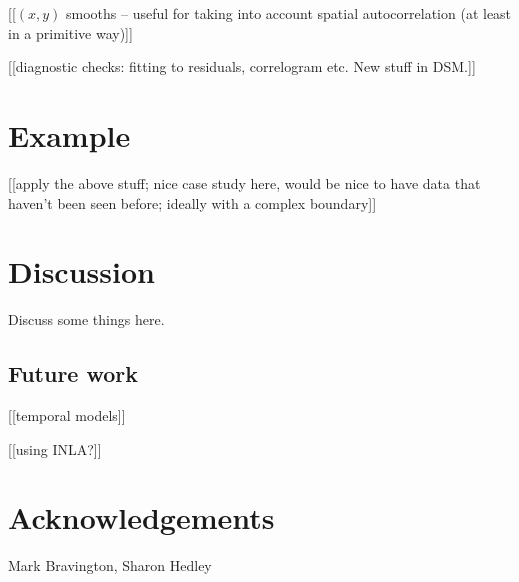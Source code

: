 \documentclass[useAMS,referee]{biom}
\begin{document}
[[$(x,y)$ smooths -- useful for taking into account spatial autocorrelation (at least in a primitive way)]]

[[diagnostic checks: fitting to residuals, correlogram etc. New stuff in DSM.]]

\section{Example}
\label{s:data}

[[apply the above stuff; nice case study here, would be nice to have data that haven't been seen before; ideally with a complex boundary]]







\section{Discussion}
\label{s:discussion}

Discuss some things here.


\subsection{Future work}

[[temporal models]]

[[using INLA?]]




\backmatter


\section*{Acknowledgements}

Mark Bravington, Sharon Hedley

\vspace*{-8pt}

\end{document}
